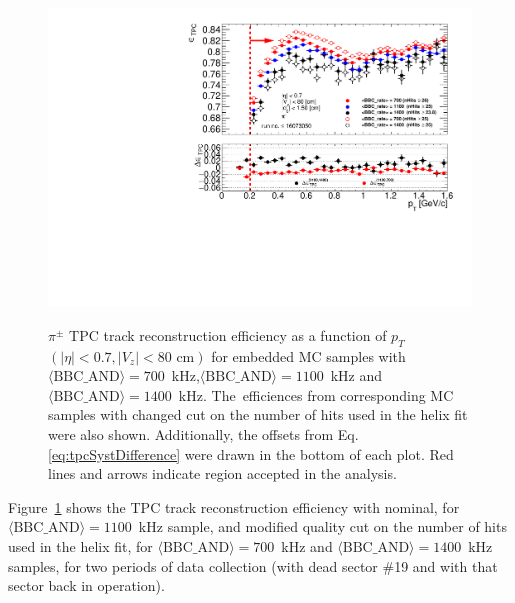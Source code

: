 \begin{figure}[b!]
{	}~
	\parbox{0.495\textwidth}{
		\centering
		\includegraphics[width=\linewidth,page=4]{graphics/systematicsEfficiency/bbc_and/tpcEffi.pdf}\\
	}\vspace{-6pt}
	\caption[$\pi^\pm$ TPC track reconstruction efficiency as a function of $p_T$ $\left(|\eta|<0.7, |V_z|<80\text{ cm}\right)$ for embedded MC samples with \mbox{$\langle\text{BBC\_AND}\rangle=700$~kHz} and \mbox{$\langle\text{BBC\_AND}\rangle=1400$~kHz}]{$\pi^\pm$ TPC track reconstruction efficiency as a function of $p_T$ $\left(|\eta|<0.7, |V_z|<80\text{ cm}\right)$ for embedded MC samples with \mbox{$\langle\text{BBC\_AND}\rangle=700$~kHz},\mbox{$\langle\text{BBC\_AND}\rangle=1100$~kHz} and \mbox{$\langle\text{BBC\_AND}\rangle=1400$~kHz}. The~efficiences from corresponding MC samples with changed cut on the number of hits used in the helix fit were also shown. Additionally, the offsets  from Eq. \ref{eq:tpcSystDifference} were drawn in the bottom of each plot. Red lines and arrows indicate region accepted in the analysis.}
	\label{fig:systError1Dtpc}
\end{figure}

Figure~\ref{fig:systError1Dtpc} shows the TPC track reconstruction efficiency with nominal, for   \mbox{$\langle\text{BBC\_AND}\rangle=1100$~kHz} sample, and modified quality cut on the number of hits used in the helix fit, for \mbox{$\langle\text{BBC\_AND}\rangle=700$~kHz} and \mbox{$\langle\text{BBC\_AND}\rangle=1400$~kHz} samples, for two periods of data collection (with dead sector \#19 and with that sector back in operation). 



